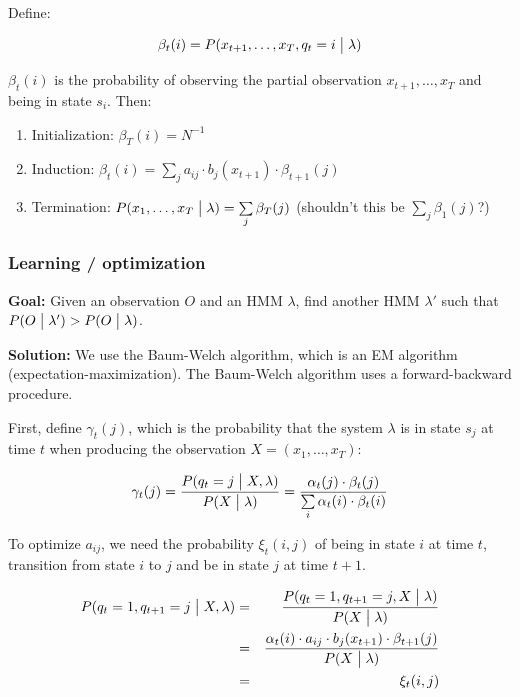 Define:

\begin{equation}
    \beta_t(i) = P(x_{t+1}, \ldots, x_T, q_t = i \bigm| \lambda)
\end{equation}

\vspace{10pt}

$\beta_t(i)$ is the probability of observing the partial observation $x_{t+1}, \ldots, x_T$ and being in state $s_i$. Then:

\begin{enumerate}
    \item Initialization: $\beta_T(i) = N^{-1}$
    \item Induction: $\beta_t(i) = \sum\limits_j a_{ij} \cdot b_j(x_{t+1}) \cdot \beta_{t+1}(j)$
    \item Termination: $P(x_1, \ldots, x_T \bigm| \lambda) = \sum\limits_j \beta_T(j)$ (shouldn't this be $\sum\limits_j \beta_1(j)$?)
\end{enumerate}

\subsubsection{Learning / optimization}

\textbf{Goal:} Given an observation $O$ and an HMM $\lambda$, find another HMM $\lambda'$ such that $P(O \bigm| \lambda') > P(O \bigm| \lambda)$.

\textbf{Solution:} We use the Baum-Welch algorithm, which is an EM algorithm (expectation-maximization). The Baum-Welch algorithm uses a forward-backward procedure.

First, define $\gamma_t(j)$, which is the probability that the system $\lambda$ is in state $s_j$ at time $t$ when producing the observation $X = (x_1, \ldots, x_T)$:

\begin{equation}
    \gamma_t(j) = \frac{P(q_t = j \bigm| X, \lambda)}{P(X \bigm| \lambda)} = \frac{\alpha_t(j) \cdot \beta_t(j)}{\sum\limits_i \alpha_t(i) \cdot \beta_t(i)}
\end{equation}

To optimize $a_{ij}$, we need the probability $\xi_t(i, j)$ of being in state $i$ at time $t$, transition from state $i$ to $j$ and be in state $j$ at time $t+1$.

\begin{eqnarray*}
    P(q_t = 1, q_{t+1} = j \bigm| X, \lambda) &=& \frac{P(q_t = 1, q_{t+1} = j, X \bigm| \lambda)}{P(X \bigm| \lambda)} \\
                                              &=& \frac{\alpha_t(i) \cdot a_{ij} \cdot b_j(x_{t+1}) \cdot \beta_{t+1}(j)}{P(X \bigm| \lambda)} \\
                                              &=& \xi_t(i, j)
\end{eqnarray*}

